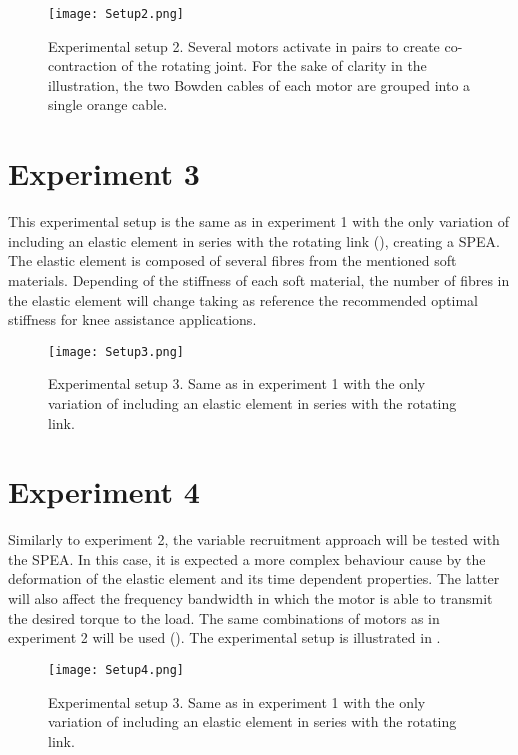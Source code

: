 \begin{figure}[hbt!]
    \centering
    \texttt{[image: Setup2.png]}
    \caption{Experimental setup 2. Several motors activate in pairs to create co-contraction of the rotating joint. For the sake of clarity in the illustration, the two Bowden cables of each motor are grouped into a single orange cable.}
    \label{fig:setup2}
\end{figure}

\section{Experiment 3}

This experimental setup is the same as in experiment 1 with the only variation of including an elastic element in series with the rotating link (), creating a SPEA. The elastic element is composed of several fibres from the mentioned soft materials. Depending of the stiffness of each soft material, the number of fibres in the elastic element will change taking as reference the recommended optimal stiffness for knee assistance applications. 

\begin{figure}[hbt!]
    \centering
    \texttt{[image: Setup3.png]}
    \caption{Experimental setup 3. Same as in experiment 1 with the only variation of including an elastic element in series with the rotating link.}
    \label{fig:setup3}
\end{figure}

\section{Experiment 4}

Similarly to experiment 2, the variable recruitment approach will be tested with the SPEA. In this case, it is expected a more complex behaviour cause by the deformation of the elastic element and its time dependent properties. The latter will also affect the frequency bandwidth in which the motor is able to transmit the desired torque to the load. The same combinations of motors as in experiment 2 will be used (). The experimental setup is illustrated in .

\begin{figure}[hbt!]
    \centering
    \texttt{[image: Setup4.png]}
    \caption{Experimental setup 3. Same as in experiment 1 with the only variation of including an elastic element in series with the rotating link.}
    \label{fig:setup4}
\end{figure}
